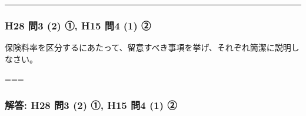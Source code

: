 \documentclass[
]{article}
\begin{document}
\begin{center}\rule{0.5\linewidth}{0.5pt}\end{center}

\hypertarget{h28-ux554f3-2-ux2460-h15-ux554f4-1-ux2461}{%
\subsubsection{H28 問3 (2) ①, H15 問4 (1)
②}\label{h28-ux554f3-2-ux2460-h15-ux554f4-1-ux2461}}

保険料率を区分するにあたって、留意すべき事項を挙げ、それぞれ簡潔に説明しなさい。

===

\hypertarget{ux89e3ux7b54-h28-ux554f3-2-ux2460-h15-ux554f4-1-ux2461}{%
\subsubsection{解答: H28 問3 (2) ①, H15 問4 (1)
②}\label{ux89e3ux7b54-h28-ux554f3-2-ux2460-h15-ux554f4-1-ux2461}}
\end{document}
